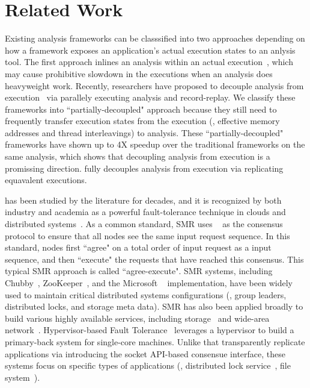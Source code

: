 \section{Related Work} \label{sec:related}

Existing analysis frameworks can be classsified into two approaches depending 
on how a framework exposes an application's actual execution states to an 
anlysis tool. The first approach inlines an analysis within an 
actual execution~\cite{dynamorio, pin:pldi05, 
valgrind:pldi, lift:micro06, tsan}, which may cause prohibitive slowdown in the executions when 
an analysis does heavyweight work. Recently, researchers have proposed to 
decouple analysis from execution~\cite{decouple:usenix08, speck:asplos08, 
shadowreplica:ccs13, wester:parallelizing:asplos13, superpin, jungwoo:oopsla09} 
via parallely executing analysis and record-replay. We classify these frameworks 
into ``partially-decoupled" approach because they still need to frequently 
transfer execution states from the execution (\eg, effective memory addresses 
and thread interleavings) to analysis. These ``partially-decoupled" frameworks 
have shown up to 4X speedup over the traditional frameworks on the same 
analysis, which shows that decoupling analysis from execution is a promissing 
direction. \xxx fully decouples analysis from execution via replicating 
equavalent executions.

\smr has been studied by the literature for decades, and it is recognized by 
both industry and academia as a powerful fault-tolerance technique in clouds 
and distributed systems~\cite{lamportclock, smr:tutorial}. As a common 
standard, SMR uses \paxos~\cite{paxos} as the consensus protocol to ensure that 
all nodes see the same input request sequence. In this standard, nodes first 
``agree" on a total order of input request as a input sequence, and then 
``execute" the requests that have reached this consensus. This typical SMR 
approach is called ``agree-execute". SMR systems, including 
Chubby~\cite{chubby:osdi}, ZooKeeper~\cite{zookeeper}, and 
the Microsoft \paxos~\cite{paxos} implementation, have been widely used to 
maintain critical distributed systems configurations (\eg, group leaders, 
distributed locks, and storage meta data). SMR has also been applied broadly to 
build various highly available services, including 
storage~\cite{paxos:datastore} and wide-area network~\cite{mencius:osdi08}. 
Hypervisor-based Fault Tolerance~\cite{hft:sosp95} leverages a hypervisor to 
build a primary-back system for single-core machines. Unlike \xxx that 
transparently replicate applications via introducing the socket API-based 
consensue interface, these systems focus on specific types of applications 
(\eg, distributed lock service~\cite{chubby:osdi}, file 
system~\cite{zookeeper}).

